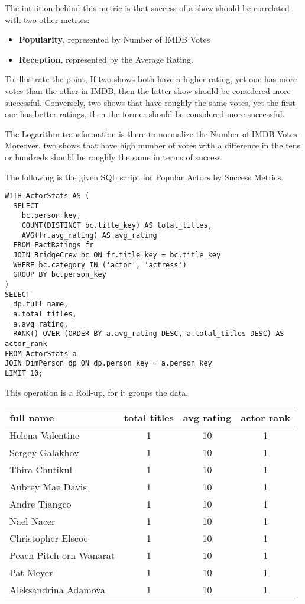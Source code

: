 \documentclass[sigconf, pbalance]{acmart}
\begin{document}
The intuition behind this metric is that success of a show should be correlated with two other metrics:
\begin{itemize}
    \item \textbf{Popularity}, represented by Number of IMDB Votes
    \item \textbf{Reception}, represented by the Average Rating. 
\end{itemize}

To illustrate the point, If two shows both have a higher rating, yet one has more votes than the other in IMDB, then the latter show should be considered more successful. Conversely, two shows that have roughly the same votes, yet the first one has better ratings, then the former should be considered more successful. 

The Logarithm transformation is there to normalize the Number of IMDB Votes. Moreover, two shows that have high number of votes with a difference in the tens or hundreds should be roughly the same in terms of success.

The following is the given SQL script for Popular Actors by Success Metrics.
\begin{lstlisting}[style=SQLStyle]
WITH ActorStats AS (
  SELECT 
    bc.person_key,
    COUNT(DISTINCT bc.title_key) AS total_titles,
    AVG(fr.avg_rating) AS avg_rating
  FROM FactRatings fr
  JOIN BridgeCrew bc ON fr.title_key = bc.title_key
  WHERE bc.category IN ('actor', 'actress')
  GROUP BY bc.person_key
)
SELECT 
  dp.full_name,
  a.total_titles,
  a.avg_rating,
  RANK() OVER (ORDER BY a.avg_rating DESC, a.total_titles DESC) AS actor_rank
FROM ActorStats a
JOIN DimPerson dp ON dp.person_key = a.person_key
LIMIT 10;
\end{lstlisting}



This operation is a Roll-up, for it groups the data.

\begin{center}
\begin{tabular}{|p{3cm}|c|c|c|}
\hline
full name & total titles & avg rating & actor rank\\
\hline
Helena Valentine & 1 & 10 & 1\\
Sergey Galakhov & 1 & 10 & 1\\
Thira Chutikul & 1 & 10 & 1\\
Aubrey Mae Davis & 1 & 10 & 1\\
Andre Tiangco & 1 & 10 & 1\\
Nael Nacer & 1 & 10 & 1\\
Christopher Elscoe & 1 & 10 & 1\\
Peach Pitch-orn Wanarat & 1 & 10 & 1\\
Pat Meyer & 1 & 10 & 1\\
Aleksandrina Adamova & 1 & 10 & 1\\
\hline
\end{tabular}
\end{center}
\end{document}
